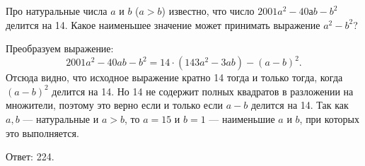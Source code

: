 

\begin{itemize}

\itC Про натуральные числа $a$ и $b$ ($a>b$) известно, что число $2001a^2-40аb-b^2$ делится на 14.
Какое наименьшее значение может принимать выражение $a^2-b^2$?

\itr Преобразуем выражение:
$$
2001a^2-40ab-b^2=14\cdot(143a^2-3ab)-(a-b)^2.
$$
Отсюда видно, что  исходное выражение кратно 14 тогда и только тогда, когда $(a-b)^2$ 
делится на 14. Но 14 не содержит полных квадратов в разложении на множители, поэтому 
это верно если и только если $a-b$ делится на 14. Так как $a,b$ --- натуральные и $a>b$, 
то $a=15$ и $b=1$ --- наименьшие $a$ и $b$, при которых это выполняется. 

Ответ: 224.

\end{itemize}

